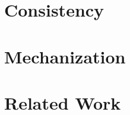 \documentclass[nonacm]{acmart}
\begin{document}
\section{Consistency}
\label{sec:logrelproof}

\section{Mechanization}
\label{sec:logrelmech}

\section{Related Work}
\label{sec:relatedwork}








\end{document}
